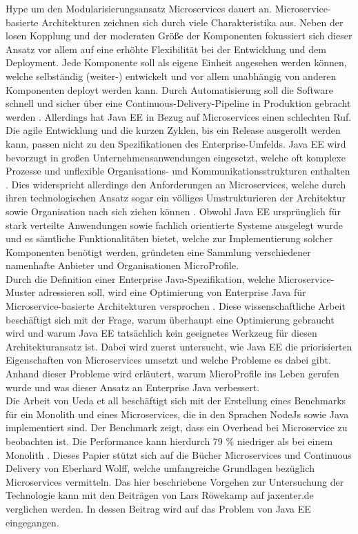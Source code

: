  Hype um den Modularisierungsansatz Microservices dauert an. Microservice-basierte Architekturen zeichnen sich durch viele Charakteristika aus. Neben der losen Kopplung und der moderaten Größe der Komponenten fokussiert sich dieser Ansatz vor allem auf eine erhöhte Flexibilität bei der Entwicklung und dem Deployment. Jede Komponente soll als eigene Einheit angesehen werden können, welche selbständig (weiter-) entwickelt und vor allem unabhängig von anderen Komponenten deployt werden kann. Durch Automatisierung soll die Software schnell und sicher über eine Continuous-Delivery-Pipeline in Produktion gebracht werden \cite{EberhardWolff.2015}. Allerdings hat Java EE in Bezug auf Microservices einen schlechten Ruf. Die agile Entwicklung und die kurzen Zyklen, bis ein Release ausgerollt werden kann, passen nicht zu den Spezifikationen des Enterprise-Umfelds. Java EE wird bevorzugt in großen Unternehmensanwendungen eingesetzt, welche oft komplexe Prozesse und unflexible Organisations- und Kommunikationsstrukturen enthalten \cite{jaxcenter.2016}. Dies widerspricht allerdings den Anforderungen an Microservices, welche durch ihren technologischen Ansatz sogar ein völliges Umstrukturieren der Architektur sowie Organisation nach sich ziehen können \cite{EberhardWolff.2015}. Obwohl Java EE ursprünglich für stark verteilte Anwendungen sowie fachlich orientierte Systeme ausgelegt wurde und es sämtliche Funktionalitäten bietet, welche zur Implementierung solcher Komponenten benötigt werden, gründeten eine Sammlung verschiedener namenhafte Anbieter und Organisationen MicroProfile.\\
Durch die Definition einer Enterprise Java-Spezifikation, welche Microservice-Muster adressieren soll, wird eine Optimierung von Enterprise Java für Microservice-basierte Architekturen versprochen \cite{Microprofile.2017}. Diese wissenschaftliche Arbeit beschäftigt sich mit der Frage, warum überhaupt eine Optimierung gebraucht wird und warum Java EE tatsächlich kein geeignetes Werkzeug für diesen Architekturansatz ist. Dabei wird zuerst untersucht, wie Java EE die priorisierten Eigenschaften von Microservices umsetzt und welche Probleme es dabei gibt. Anhand dieser Probleme wird erläutert, warum MicroProfile ins Leben gerufen wurde und was dieser Ansatz an Enterprise Java verbessert. \\
Die Arbeit von Ueda et all beschäftigt sich mit der Erstellung eines Benchmarks für ein Monolith und eines Microservices, die in den Sprachen NodeJs sowie Java implementiert sind. Der Benchmark zeigt, dass ein Overhead bei Microservice zu beobachten ist. Die Performance kann hierdurch 79 \% niedriger als bei einem Monolith \cite{uht.2016}. Dieses Papier stützt sich auf die Bücher Microservices \cite{EberhardWolff.2015} und Continuous Delivery \cite{EberhardWolff.2016} von Eberhard Wolff, welche umfangreiche Grundlagen bezüglich Microservices vermitteln. Das hier beschriebene Vorgehen zur Untersuchung der Technologie kann mit den Beiträgen von Lars Röwekamp auf jaxenter.de verglichen werden. In dessen Beitrag wird auf das Problem von Java EE eingegangen. 
